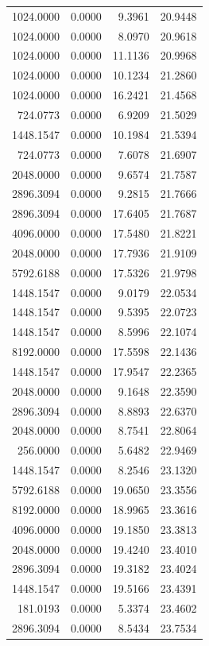 \begin{tabular}{rrrr}
1024.0000 & 0.0000 & 9.3961 & 20.9448 \\
1024.0000 & 0.0000 & 8.0970 & 20.9618 \\
1024.0000 & 0.0000 & 11.1136 & 20.9968 \\
1024.0000 & 0.0000 & 10.1234 & 21.2860 \\
1024.0000 & 0.0000 & 16.2421 & 21.4568 \\
724.0773 & 0.0000 & 6.9209 & 21.5029 \\
1448.1547 & 0.0000 & 10.1984 & 21.5394 \\
724.0773 & 0.0000 & 7.6078 & 21.6907 \\
2048.0000 & 0.0000 & 9.6574 & 21.7587 \\
2896.3094 & 0.0000 & 9.2815 & 21.7666 \\
2896.3094 & 0.0000 & 17.6405 & 21.7687 \\
4096.0000 & 0.0000 & 17.5480 & 21.8221 \\
2048.0000 & 0.0000 & 17.7936 & 21.9109 \\
5792.6188 & 0.0000 & 17.5326 & 21.9798 \\
1448.1547 & 0.0000 & 9.0179 & 22.0534 \\
1448.1547 & 0.0000 & 9.5395 & 22.0723 \\
1448.1547 & 0.0000 & 8.5996 & 22.1074 \\
8192.0000 & 0.0000 & 17.5598 & 22.1436 \\
1448.1547 & 0.0000 & 17.9547 & 22.2365 \\
2048.0000 & 0.0000 & 9.1648 & 22.3590 \\
2896.3094 & 0.0000 & 8.8893 & 22.6370 \\
2048.0000 & 0.0000 & 8.7541 & 22.8064 \\
256.0000 & 0.0000 & 5.6482 & 22.9469 \\
1448.1547 & 0.0000 & 8.2546 & 23.1320 \\
5792.6188 & 0.0000 & 19.0650 & 23.3556 \\
8192.0000 & 0.0000 & 18.9965 & 23.3616 \\
4096.0000 & 0.0000 & 19.1850 & 23.3813 \\
2048.0000 & 0.0000 & 19.4240 & 23.4010 \\
2896.3094 & 0.0000 & 19.3182 & 23.4024 \\
1448.1547 & 0.0000 & 19.5166 & 23.4391 \\
181.0193 & 0.0000 & 5.3374 & 23.4602 \\
2896.3094 & 0.0000 & 8.5434 & 23.7534 \\

\end{tabular}
